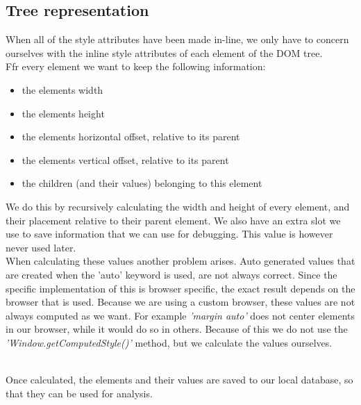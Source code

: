 \subsection{Tree representation}
 When all of the style attributes have been made in-line, we only have to concern ourselves with the inline style attributes of each element of the DOM tree.
\\Ffr every element we want to keep the following information:
\begin{itemize}
	\item the elements width
	\item the elements height
	\item the elements horizontal offset, relative to its parent
	\item the elements vertical offset, relative to its parent
	\item the children (and their values) belonging to this element
\end{itemize}
We do this by recursively calculating the width and height of every element, and their placement relative to their parent element. We also have an extra slot we use to save information that we can use for debugging. This value is however never used later.
\\When calculating these values another problem arises. Auto generated values that are created when the 'auto' keyword is used, are not always correct. Since the specific implementation of this is browser specific, the exact result depends on the browser that is used. Because we are using a custom browser, these values are not always computed as we want. For example \textit{'margin auto'} does not center elements in our browser, while it would do so in others. Because of this we do not use the \textit{'Window.getComputedStyle()'} method, but we calculate the values ourselves. 

\\Once calculated, the elements and their values are saved to our local database, so that they can be used for analysis.

